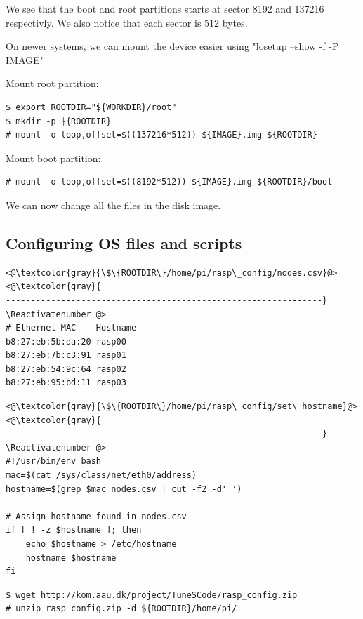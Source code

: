 We see that the boot and root partitions starts at sector 8192 and 137216 respectivly.
We also notice that each sector is 512 bytes.


On newer systems, we can mount the device easier using "losetup --show -f -P IMAGE"

Mount root partition:

\begin{lstlisting}[]
$ export ROOTDIR="${WORKDIR}/root"
$ mkdir -p ${ROOTDIR}
# mount -o loop,offset=$((137216*512)) ${IMAGE}.img ${ROOTDIR}
\end{lstlisting}
\FloatBarrier

Mount boot partition:
\begin{lstlisting}[]
# mount -o loop,offset=$((8192*512)) ${IMAGE}.img ${ROOTDIR}/boot
\end{lstlisting}
\FloatBarrier

We can now change all the files in the disk image.



\subsection{Configuring OS files and scripts}


\Suppressnumber\begin{lstlisting}[]
<@\textcolor{gray}{\$\{ROOTDIR\}/home/pi/rasp\_config/nodes.csv}@>
<@\textcolor{gray}{
---------------------------------------------------------------}
\Reactivatenumber @>
# Ethernet MAC    Hostname
b8:27:eb:5b:da:20 rasp00
b8:27:eb:7b:c3:91 rasp01
b8:27:eb:54:9c:64 rasp02
b8:27:eb:95:bd:11 rasp03
\end{lstlisting}
\FloatBarrier


\Suppressnumber\begin{lstlisting}[]
<@\textcolor{gray}{\$\{ROOTDIR\}/home/pi/rasp\_config/set\_hostname}@>
<@\textcolor{gray}{
---------------------------------------------------------------}
\Reactivatenumber @>
#!/usr/bin/env bash
mac=$(cat /sys/class/net/eth0/address)
hostname=$(grep $mac nodes.csv | cut -f2 -d' ')

# Assign hostname found in nodes.csv
if [ ! -z $hostname ]; then
    echo $hostname > /etc/hostname
    hostname $hostname
fi
\end{lstlisting}
\FloatBarrier



\begin{lstlisting}[]
$ wget http://kom.aau.dk/project/TuneSCode/rasp_config.zip
# unzip rasp_config.zip -d ${ROOTDIR}/home/pi/
\end{lstlisting}
\FloatBarrier


